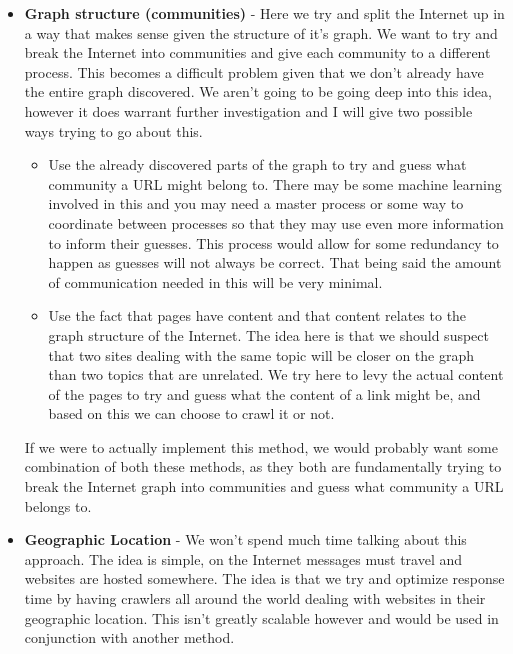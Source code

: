 \documentclass{article}
\begin{document}
\begin{itemize}
\begin{itemize}
			Now that we have a hash function we may take the hash of any URL\footnote{In a computer everything may be treated as an integer if desired, even strings like URLs, so we can in fact take the Hash of a URL.} and based on that determine which process should crawl that page. This ensures that each process has an equal chunk of the Internet to crawl but at the cost that a crawler will be finding many links outside it's partition.
			
			\item \textbf{Graph structure (communities)} - Here we try and split the Internet up in a way that makes sense given the structure of it's graph. We want to try and break the Internet into communities and give each community to a different process. This becomes a difficult problem given that we don't already have the entire graph discovered. We aren't going to be going deep into this idea, however it does warrant further investigation and I will give two possible ways trying to go about this.
			
			\begin{itemize}
				\item Use the already discovered parts of the graph to try and guess what community a URL might belong to. There may be some machine learning involved in this and you may need a master process or some way to coordinate between processes so that they may use even more information to inform their guesses. This process would allow for some redundancy to happen as guesses will not always be correct. That being said the amount of communication needed in this will be very minimal.
				
				\item Use the fact that pages have content and that content relates to the graph structure of the Internet. The idea here is that we should suspect that two sites dealing with the same topic will be closer on the graph than two topics that are unrelated. We try here to levy the actual content of the pages to try and guess what the content of a link might be, and based on this we can choose to crawl it or not.
			\end{itemize} 
			
			If we were to actually implement this method, we would probably want some combination of both these methods, as they both are fundamentally trying to break the Internet graph into communities and guess what community a URL belongs to.
			
			\item \textbf{Geographic Location} - We won't spend much time talking about this approach. The idea is simple, on the Internet messages must travel and websites are hosted somewhere. The idea is that we try and optimize response time by having crawlers all around the world dealing with websites in their geographic location. This isn't greatly scalable however and would be used in conjunction with another method.
		\end{itemize}
	\end{itemize}
	
\end{document}
